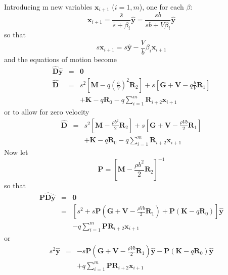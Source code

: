 \documentclass[11pt,openany,twoside]{book}
\numberwithin{equation}{section}		%
\newcommand{\Matrix}[1]{\boldsymbol{#1}}
\newcommand{\Vector}[1]{\boldsymbol{#1}}
\begin{document}
Introducing m new variables $\Vector{x}_{i+1}$ ($i=1,m$), one for each $\beta$:
\begin{equation}
	\Vector{x}_{i+1} = \frac{\bar{s}}{\bar{s} + \beta_i} \hat{\Vector{y}}
		= \frac{sb}{sb + V \beta_i} \hat{\Vector{y}}		\nonumber
\end{equation}
so that
\begin{equation} \label{eqn:beta-s}
	s \Vector{x}_{i+1} = s \hat{\Vector{y}} - \frac{V}{b} \beta_i \Vector{x}_{i+1}
\end{equation}
and the equations of motion become
\begin{eqnarray}
	\hat{\Matrix{D}}\hat{\Vector{y}} &=& \Vector{0} \nonumber \\
	\hat{\Matrix{D}} &=& s^2 \left[ \Matrix{M} - q\left(\frac{b}{V}\right)^2 \Matrix{R}_2 \right]
		+ s \left[ \Matrix{G} + \Matrix{V} - q\frac{b}{V} \Matrix{R}_1 \right] \nonumber \\
		& & + \Matrix{K} - q \Matrix{R}_0 - q \sum_{i=1}^{m} \Matrix{R}_{i+2} \Vector{x}_{i+1} \nonumber
\end{eqnarray}
or to allow for zero velocity
\begin{eqnarray}
	\hat{\Matrix{D}} &=& s^2 \left[ \Matrix{M} - \frac{\rho b^2}{2}\Matrix{R}_2 \right]
		+ s \left[ \Matrix{G} + \Matrix{V} - \frac{\rho V b}{2} \Matrix{R}_1 \right] \nonumber \\
		& & + \Matrix{K} - q \Matrix{R}_0 - q \sum_{i=1}^{m} \Matrix{R}_{i+2} \Vector{x}_{i+1}
\end{eqnarray}
Now let
\begin{equation}
\Matrix{P} = \left[\Matrix{M} - \frac{\rho b^2}{2}\Matrix{R}_2\right]^{-1}		\nonumber
\end{equation}
so that
\begin{eqnarray}
	\Vector{P}\hat{\Vector{D}}\hat{\Vector{y}} & = & \Vector{0} \nonumber \\
					 & = & \left[ s^2 + s\Matrix{P} \left(\Matrix{G} + \Matrix{V}
						- \frac{\rho V b}{2}\Matrix{R}_1 \right) + \Matrix{P} \left( \Matrix{K}
						- q \Matrix{R}_0 \right) \right] \hat{\Vector{y}} \nonumber \\
						& & - q \sum_{i=1}^{m} \Matrix{PR}_{i+2} \Vector{x}_{i+1} \nonumber
\end{eqnarray}
or
\begin{eqnarray}\label{eqn:eom-fd}
	s^2\hat{\Vector{y}} &=& -s \Matrix{P} \left(\Matrix{G} + \Matrix{V} -
				\frac{\rho V b}{2}\Matrix{R}_1 \right) \hat{\Vector{y}} -
				\Matrix{P} \left(\Matrix{K} - q\Matrix{R}_0 \right)\hat{\Vector{y}} \nonumber \\
				& & + q \sum_{i=1}^{m} \Matrix{PR}_{i+2} \Vector{x}_{i+1}
\end{eqnarray}
\end{document}
